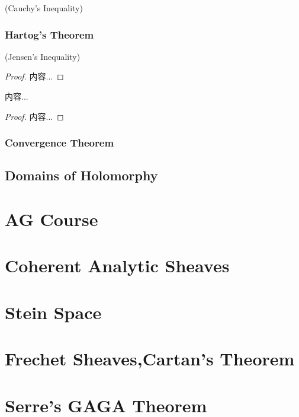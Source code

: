 \documentclass[Total.tex]{subfiles}
\begin{document}
			\begin{proposition}
				(Cauchy's Inequality)
			\end{proposition}
		\subsection{Hartog's Theorem}
		\begin{proposition}
			(Jensen's Inequality)
		\end{proposition}
		\begin{proof}
			内容...
		\end{proof}
		\begin{proposition}
			内容...
		\end{proposition}
		\begin{proof}
			内容...
		\end{proof}
		
		\subsection{Convergence Theorem}
		\section{Domains of Holomorphy}
	\chapter{AG Course}
	\chapter{Coherent Analytic Sheaves}
	\chapter{Stein Space}
	\chapter{Frechet Sheaves,Cartan's Theorem}
	\chapter{Serre's GAGA Theorem}
\end{document}
